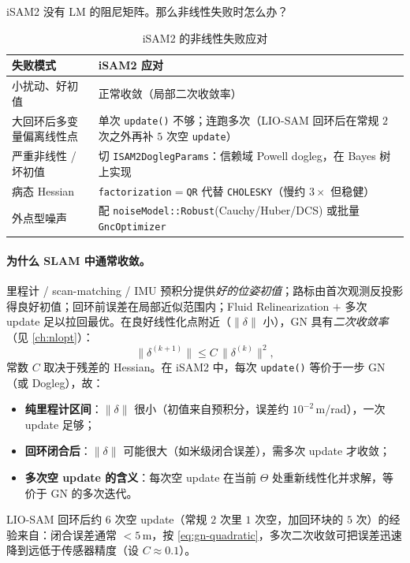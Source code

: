iSAM2 没有 LM 的阻尼矩阵。那么非线性失败时怎么办？

\begin{table}[H]\centering\small
\caption{iSAM2 的非线性失败应对}
\label{tab:isam-failure}
\begin{tabular}{ll}
\toprule
失败模式 & iSAM2 应对 \\
\midrule
小扰动、好初值 & 正常收敛（局部二次收敛率） \\
大回环后多变量偏离线性点 & 单次 \texttt{update()} 不够；连跑多次（LIO-SAM 回环后在常规 $2$ 次之外再补 $5$ 次空 \texttt{update}） \\
严重非线性 / 坏初值 & 切 \texttt{ISAM2DoglegParams}：信赖域 Powell dogleg\cite{rosen2014rise}，在 Bayes 树上实现 \\
病态 Hessian & \texttt{factorization}$=$\texttt{QR} 代替 \texttt{CHOLESKY}（慢约 $3\times$ 但稳健） \\
外点型噪声 & 配 \texttt{noiseModel::Robust}(Cauchy/Huber/DCS) 或批量 \texttt{GncOptimizer} \\
\bottomrule
\end{tabular}
\end{table}

\paragraph{为什么 SLAM 中通常收敛。}
里程计 / scan-matching / IMU 预积分提供\emph{好的位姿初值}；路标由首次观测反投影得良好初值；回环前误差在局部近似范围内；Fluid Relinearization $+$ 多次 update 足以拉回最优。在良好线性化点附近（$\|\delta\|$ 小），GN 具有\emph{二次收敛率}（见 \cref{ch:nlopt}）：
\begin{equation}
  \|\delta^{(k+1)}\|\le C\,\|\delta^{(k)}\|^2,
  \label{eq:gn-quadratic}
\end{equation}
常数 $C$ 取决于残差的 Hessian。在 iSAM2 中，每次 \texttt{update()} 等价于一步 GN（或 Dogleg），故：
\begin{itemize}
  \item \textbf{纯里程计区间}：$\|\delta\|$ 很小（初值来自预积分，误差约 $10^{-2}$\,m/rad），一次 update 足够；
  \item \textbf{回环闭合后}：$\|\delta\|$ 可能很大（如米级闭合误差），需多次 update 才收敛；
  \item \textbf{多次空 update 的含义}：每次空 update 在当前 $\Theta$ 处重新线性化并求解，等价于 GN 的多次迭代。
\end{itemize}
LIO-SAM 回环后约 $6$ 次空 update（常规 $2$ 次里 $1$ 次空，加回环块的 $5$ 次）的经验来自：闭合误差通常 $<5$\,m，按 \cref{eq:gn-quadratic}，多次二次收敛可把误差迅速降到远低于传感器精度（设 $C\approx 0.1$）。

